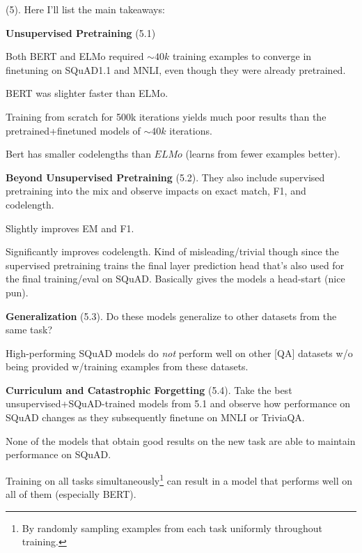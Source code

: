 \documentclass[11pt]{article}
\begin{document}
 (5). Here I'll list the main takeaways:
\begin{compactitem}
	\item \textbf{Unsupervised Pretraining} (5.1)
	\begin{compactitem}
		\item[\red \xmark]  Both BERT and ELMo required $\sim40k$ training examples to converge in finetuning on SQuAD1.1 and MNLI, even though they were already pretrained. 
		\item[\green\cmark] BERT was slighter faster than ELMo. 
		\item[\red\xmark] Training from scratch for 500k iterations yields much poor results than the pretrained+finetuned models of $\sim40k$ iterations. 
		\item[\green\cmark] Bert has smaller codelengths than $ELMo$ (learns from fewer examples better). 
	\end{compactitem}

	\item \textbf{Beyond Unsupervised Pretraining} (5.2). They also include supervised pretraining into the mix and observe impacts on exact match, F1, and codelength. 
	\begin{compactitem}
		\item[\green\cmark] Slightly improves EM and F1. 
		\item[\green\cmark] Significantly improves codelength. Kind of misleading/trivial though since the supervised pretraining trains the final layer prediction head that's also used for the final training/eval on SQuAD. Basically gives the models a head-start (nice pun). 
	\end{compactitem}

	\item \textbf{Generalization} (5.3). Do these models generalize to other datasets from the same task?
	\begin{compactitem}
		\item[\red\xmark] High-performing SQuAD models do \textit{not} perform well on other [QA] datasets w/o being provided w/training examples from these datasets.
	\end{compactitem}

	\item \textbf{Curriculum and Catastrophic Forgetting} (5.4). Take the best unsupervised+SQuAD-trained models from 5.1 and observe how performance on SQuAD changes as they subsequently finetune on MNLI or TriviaQA. 
	\begin{compactitem}
		\item[\red\xmark] None of the models that obtain good results on the new task are able to maintain performance on SQuAD.
		\item[\green\cmark] Training on all tasks simultaneously\footnote{By randomly sampling examples from each task uniformly throughout training.} can result in a model that performs well on all of them (especially BERT). 
	\end{compactitem}
\end{compactitem}
\end{document}
